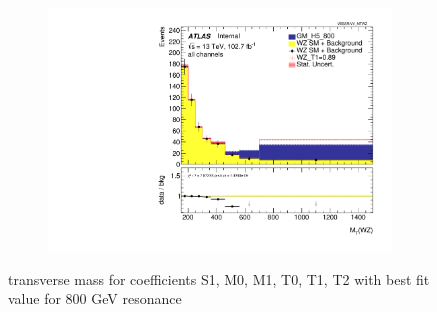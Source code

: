 \documentclass[../Bachelorarbeit.tex]{subfiles}
\begin{document}
\begin{figure}[h]
\begin{subfigure}{0.3\textwidth}
    \end{subfigure}
    \begin{subfigure}{0.3\textwidth}
        \includegraphics[width=\textwidth]{Plots/ALL_MTWZ_final/GM_H5_800/T1/2022-05-07/VBSSR/all_VV_MTWZ.pdf}
    \end{subfigure}

    \caption{transverse mass for coefficients S1, M0, M1, T0, T1, T2 with best fit value for 800 GeV resonance}
    \label{fig:all_mtwz_800}
\end{figure}
\end{document}
